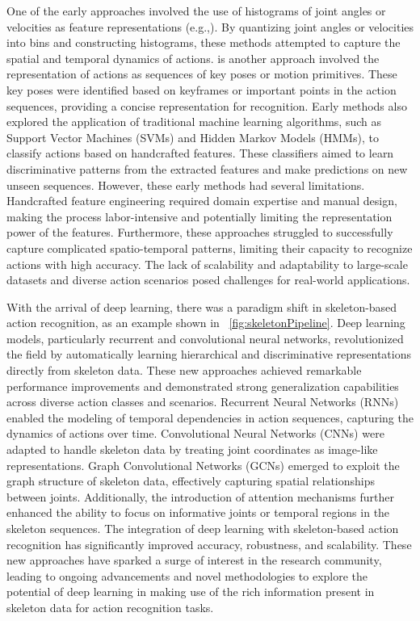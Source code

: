 One of the early approaches involved the use of histograms of joint angles or velocities as feature representations (e.g.,\cite{xia2012view}). By quantizing joint angles or velocities into bins and constructing histograms, these methods attempted to capture the spatial and temporal dynamics of actions. \cite{blank2005actions} is another approach involved the representation of actions as sequences of key poses or motion primitives. These key poses were identified based on keyframes or important points in the action sequences, providing a concise representation for recognition. Early methods also explored the application of traditional machine learning algorithms, such as Support Vector Machines (SVMs) and Hidden Markov Models (HMMs), to classify actions based on handcrafted features. These classifiers aimed to learn discriminative patterns from the extracted features and make predictions on new unseen sequences. However, these early methods had several limitations. Handcrafted feature engineering required domain expertise and manual design, making the process labor-intensive and potentially limiting the representation power of the features. Furthermore, these approaches struggled to successfully capture complicated spatio-temporal patterns, limiting their capacity to recognize actions with high accuracy. The lack of scalability and adaptability to large-scale datasets and diverse action scenarios posed challenges for real-world applications.

With the arrival of deep learning, there was a paradigm shift in skeleton-based action recognition, as an example shown in ~\ref{fig:skeletonPipeline}. Deep learning models, particularly recurrent and convolutional neural networks, revolutionized the field by automatically learning hierarchical and discriminative representations directly from skeleton data. These new approaches achieved remarkable performance improvements and demonstrated strong generalization capabilities across diverse action classes and scenarios. Recurrent Neural Networks (RNNs) enabled the modeling of temporal dependencies in action sequences, capturing the dynamics of actions over time. Convolutional Neural Networks (CNNs) were adapted to handle skeleton data by treating joint coordinates as image-like representations. Graph Convolutional Networks (GCNs) emerged to exploit the graph structure of skeleton data, effectively capturing spatial relationships between joints. Additionally, the introduction of attention mechanisms further enhanced the ability to focus on informative joints or temporal regions in the skeleton sequences. The integration of deep learning with skeleton-based action recognition has significantly improved accuracy, robustness, and scalability. These new approaches have sparked a surge of interest in the research community, leading to ongoing advancements and novel methodologies to explore the potential of deep learning in making use of the rich information present in skeleton data for action recognition tasks.

